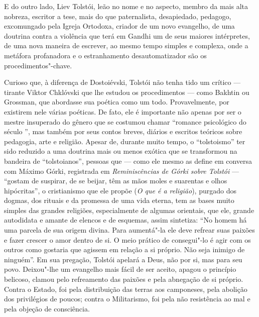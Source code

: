 {{E do outro lado, Liev Tolstói, leão no nome e no aspecto, membro da mais
alta nobreza, escritor a tese, mais do que paternalista, desapiedado, pedagogo, excomungado pela
Igreja Ortodoxa, criador de um novo evangelho, de uma doutrina contra a
violência que terá em Gandhi um de seus maiores intérpretes, de uma nova
maneira de escrever, ao mesmo tempo simples e complexa, onde a metáfora
profanadora e o estranhamento desautomatizador são os
procedimentos"-chave.

Curioso que, à diferença de Dostoiévski, Tolstói não
tenha tido um crítico --- tirante Viktor Chklóvski que lhe estudou os procedimentos --- como Bakhtin ou Grossman, que abordasse sua
poética como um todo. Provavelmente, por existirem nele várias poéticas. De fato, ele
é importante não apenas por ser o mestre insuperado do gênero que se
costumou chamar ``romance psicológico do século '', mas também por
seus contos breves, diários e escritos teóricos sobre pedagogia, arte e
religião. Apesar de, durante muito tempo, o ``tolstoismo'' ter sido
reduzido a uma doutrina mais ou menos exótica que se transformou na
bandeira de ``tolstoianos'', pessoas que --- como ele mesmo as define em
conversa com Máximo Górki, registrada em \emph{Reminiscências de Górki sobre Tolstói} --- ``gostam de suspirar, de se beijar, têm as
mãos moles e suarentas e olhos hipócritas'', o cristianismo que ele
propõe (\emph{O que é a religião}), purgado dos dogmas, dos rituais e da
promessa de uma vida eterna, tem as bases muito simples das grandes
religiões, especialmente de algumas orientais, que
ele, grande autodidata e amante de elencos e de esquemas, assim
sintetiza: ``No homem há uma parcela de sua origem divina. Para
aumentá"-la ele deve refrear suas paixões e fazer crescer o amor dentro
de si. O meio prático de consegui"-lo é agir com os outros como gostaria
que agissem em relação a si próprio. Não seja inimigo de ninguém''. Em
sua pregação, Tolstói apelará a Deus, não por si, mas para seu povo.
Deixou"-lhe um evangelho mais fácil de ser aceito, apagou o princípio
belicoso, clamou pelo refreamento das paixões e pela abnegação de si
próprio. Contra o Estado, foi pela distribuição das terras aos
camponeses, pela abolição dos privilégios de poucos; contra o
Militarismo, foi pela não resistência ao mal e pela objeção de
consciência.

}}
